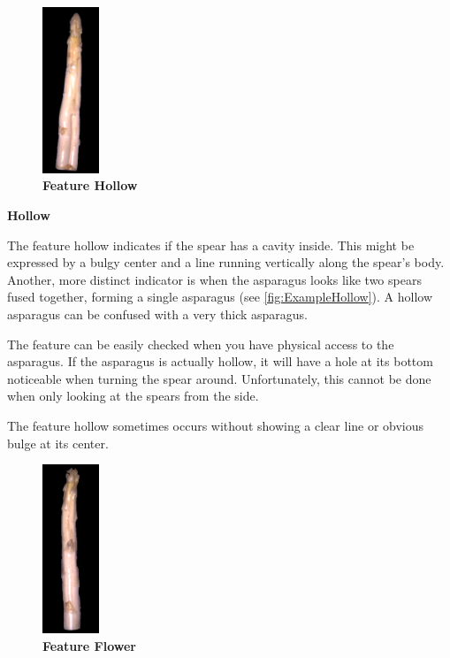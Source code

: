 \newpage

\begin{figure}
  \begin{center}
    \includegraphics[width=0.15\textwidth]{Figures/chapter03/example_img_hollow.png}
  \end{center}
  \vspace{-15pt}
  \caption[Example Image Feature Hollow]{ \textbf{Feature Hollow}}
  \vspace{10pt}
  \label{fig:ExampleHollow}
\end{figure}

\textbf{Hollow}

The feature hollow indicates if the spear has a cavity inside.
This might be expressed by a bulgy center and a line running vertically along the spear’s body. Another, more distinct indicator is when the asparagus looks like two spears fused together, forming a single asparagus (see \autoref{fig:ExampleHollow}). A hollow asparagus can be confused with a very thick asparagus.

The feature can be easily checked when you have physical access to the asparagus. If the asparagus is actually hollow, it will have a hole at its bottom noticeable when turning the spear around. Unfortunately, this cannot be done when only looking at the spears from the side.

The feature hollow sometimes occurs without showing a clear line or obvious bulge at its center.

\begin{figure}
  \begin{center}
    \includegraphics[width=0.15\textwidth]{Figures/chapter03/example_img_flower.png}
  \end{center}
  \vspace{-15pt}
  \caption[Example Image Feature Flower]{ \textbf{Feature Flower}}
  \vspace{-10pt}
  \label{fig:ExampleFlower}
\end{figure}

